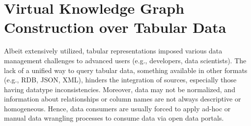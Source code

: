 \section{Virtual Knowledge Graph Construction over Tabular Data}
\label{chap6_morphgcsv}

Albeit extensively utilized, tabular representations imposed various data management challenges to advanced users (e.g., developers, data scientists). The lack of a unified way to query tabular data, something available in other formats (e.g., RDB, JSON, XML), hinders the integration of sources, especially those having datatype inconsistencies. Moreover, data may not be normalized, and information about relationships or column names are not always descriptive or homogeneous. Hence, data consumers are usually forced to apply ad-hoc or manual data wrangling processes to consume data via open data portals. 



